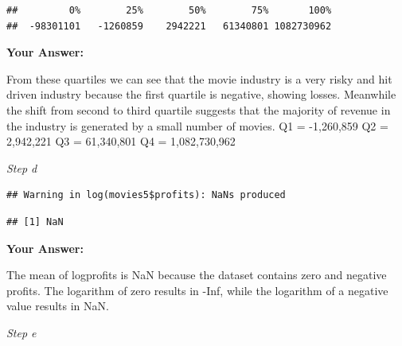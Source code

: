 \documentclass[
]{article}
\newenvironment{Shaded}{\begin{snugshade}}{\end{snugshade}}
\newcommand{\AttributeTok}[1]{\textcolor[rgb]{0.13,0.29,0.53}{#1}}
\newcommand{\ConstantTok}[1]{\textcolor[rgb]{0.56,0.35,0.01}{#1}}
\newcommand{\DecValTok}[1]{\textcolor[rgb]{0.00,0.00,0.81}{#1}}
\newcommand{\FunctionTok}[1]{\textcolor[rgb]{0.13,0.29,0.53}{\textbf{#1}}}
\newcommand{\NormalTok}[1]{#1}
\newcommand{\OtherTok}[1]{\textcolor[rgb]{0.56,0.35,0.01}{#1}}
\newcommand{\SpecialCharTok}[1]{\textcolor[rgb]{0.81,0.36,0.00}{\textbf{#1}}}
\begin{document}
\begin{verbatim}
##         0%        25%        50%        75%       100% 
##  -98301101   -1260859    2942221   61340801 1082730962
\end{verbatim}

\textbf{Your Answer:}

From these quartiles we can see that the movie industry is a very risky
and hit driven industry because the first quartile is negative, showing
losses. Meanwhile the shift from second to third quartile suggests that
the majority of revenue in the industry is generated by a small number
of movies. Q1 = -1,260,859 Q2 = 2,942,221 Q3 = 61,340,801 Q4 =
1,082,730,962

\emph{Step d}

\begin{Shaded}
\end{Shaded}

\begin{verbatim}
## Warning in log(movies5$profits): NaNs produced
\end{verbatim}

\begin{Shaded}
\end{Shaded}

\begin{verbatim}
## [1] NaN
\end{verbatim}

\textbf{Your Answer:}

The mean of logprofits is NaN because the dataset contains zero and
negative profits. The logarithm of zero results in -Inf, while the
logarithm of a negative value results in NaN.

\emph{Step e}

\begin{Shaded}
\end{Shaded}
\end{document}
